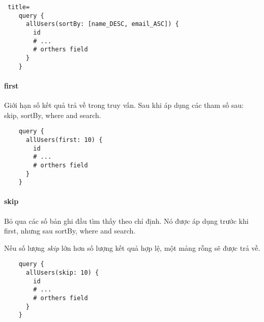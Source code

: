 \begin{lstlisting} title=
	query {
	  allUsers(sortBy: [name_DESC, email_ASC]) {
	    id
	    # ...
	    # orthers field
	  }
	}
\end{lstlisting}

\paragraph{first}

Giới hạn số kết quả trả về trong truy vấn. Sau khi áp dụng các tham số sau: {skip}, {sortBy}, {where} and {search}.

\begin{lstlisting}
	query {
	  allUsers(first: 10) {
	    id
	    # ...
	    # orthers field
	  }
	}
\end{lstlisting}

\paragraph{skip}

Bỏ qua các số bản ghi đầu tìm thấy theo chỉ định. Nó được áp dụng trước khi {first}, nhưng sau {sortBy}, {where} and {search}.

Nếu số lượng \emph{skip} lớn hơn số lượng kết quả hợp lệ, một mảng rỗng sẽ được trả về.

\begin{lstlisting}
	query {
	  allUsers(skip: 10) {
	    id
	    # ...
	    # orthers field
	  }
	}
\end{lstlisting}